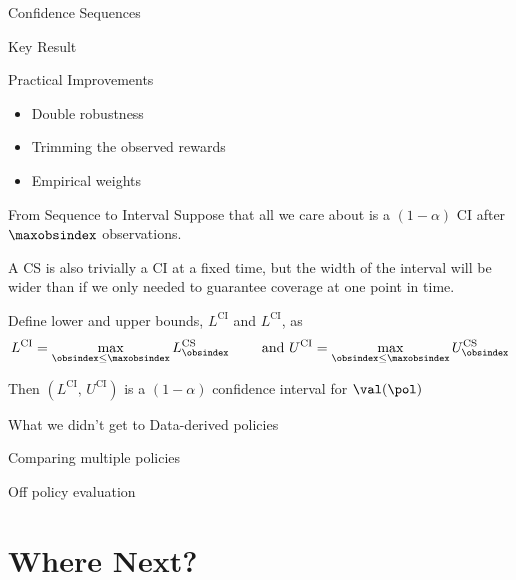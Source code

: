 \documentclass[aspectratio=169, professionalfonts]{beamer}
\begin{document}
\begin{frame}{Confidence Sequences}
	\begin{definition}
	\end{definition}
\end{frame}

\begin{frame}{Key Result}

\end{frame}

\begin{frame}{Practical Improvements}
	\begin{itemize}
		\item Double robustness
		\item Trimming the observed rewards
		\item Empirical weights
	\end{itemize}
\end{frame}

\begin{frame}{From Sequence to Interval}
	Suppose that all we care about is a $(1 - \alpha)$ CI after $\maxobsindex$
	observations.

	\vfill
	A CS is also trivially a CI at a fixed time, but the width of the interval
	will be wider than if we only needed to guarantee coverage at one point in
	time.

	\vfill \pause

	\begin{lemma} Define lower and upper bounds, $L^{\text{CI}}$ and
		$L^{\text{CI}}$, as
		$$L^{\text{CI}} = \max_{\obsindex \leq \maxobsindex}
			L_{\obsindex}^{\text{CS}} \qquad \text{ and } U^{\text{CI}} = \max_{\obsindex \leq
				\maxobsindex} U_{\obsindex}^{\text{CS}}$$

		Then $(L^{\text{CI}},\, U^{\text{CI}})$ is a $(1 - \alpha)$ confidence
		interval for $\val(\pol)$
	\end{lemma}
\end{frame}

\begin{frame}{What we didn't get to}
	Data-derived policies

	Comparing multiple policies

	Off policy evaluation
\end{frame}
\section{Where Next?}
\end{document}
